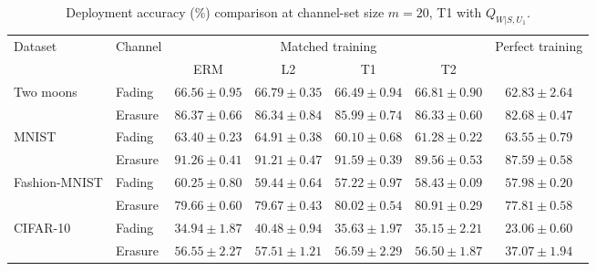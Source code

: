 \begin{table}[htb]
\centering
\caption{Deployment accuracy (\%) comparison at channel-set size $m=20$, T1 with $Q_{W|S,U_1}$.}
\label{tab:performance}
\begin{tabular*}{\linewidth}{@{\extracolsep{\fill}}llccccc@{}}
\toprule
\multirow{2}{*}{Dataset} & \multirow{2}{*}{Channel}
& \multicolumn{4}{c}{Matched training} & \multirow{2}{*}{Perfect training} \\
\cmidrule(lr){3-6}
& & ERM & L2 & T1 & T2 &  \\
\midrule
\multirow{2}{*}{Two moons}
& Fading
& $66.56\pm0.95$ & $66.79\pm0.35$ & $66.49\pm0.94$ & $\mathbf{66.81}\pm0.90$ & $62.83\pm2.64$ \\
& Erasure
& $\mathbf{86.37}\pm0.66$ & $86.34\pm0.84$ & $85.99\pm0.74$ & $86.33\pm0.60$ & $82.68\pm0.47$ \\
\midrule
\multirow{2}{*}{MNIST}
& Fading
& $63.40\pm0.23$ & $\mathbf{64.91}\pm0.38$ & $60.10\pm0.68$ & $61.28\pm0.22$ & $63.55\pm0.79$ \\
& Erasure
& $91.26\pm0.41$ & $91.21\pm0.47$ & $\mathbf{91.59}\pm0.39$ & $89.56\pm0.53$ & $87.59\pm0.58$ \\
\midrule
\multirow{2}{*}{Fashion-MNIST}
& Fading
& $\mathbf{60.25}\pm0.80$ & $59.44\pm0.64$ & $57.22\pm0.97$ & $58.43\pm0.09$ & $57.98\pm0.20$ \\
& Erasure
& $79.66\pm0.60$ & $79.67\pm0.43$ & $80.02\pm0.54$ & $\mathbf{80.91}\pm0.29$ & $77.81\pm0.58$ \\
\midrule
\multirow{2}{*}{CIFAR-10}
& Fading
& $34.94\pm1.87$ & $\mathbf{40.48}\pm0.94$ & $35.63\pm1.97$ & $35.15\pm2.21$ & $23.06\pm0.60$ \\
& Erasure
& $56.55\pm2.27$ & $\mathbf{57.51}\pm1.21$ & $56.59\pm2.29$ & $56.50\pm1.87$ & $37.07\pm1.94$ \\
\bottomrule
\end{tabular*}
\end{table}
